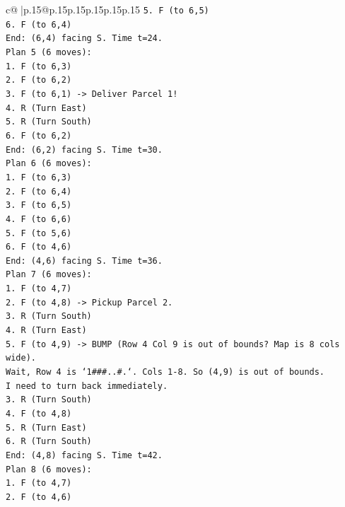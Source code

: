 \documentclass{article}
\begin{document}
{\begin{supertabular}{c@{$\;$}|p{.15\linewidth}@{}p{.15\linewidth}p{.15\linewidth}p{.15\linewidth}p{.15\linewidth}p{.15\linewidth}}
{{{\texttt{5. F (to 6,5)} \\
\texttt{6. F (to 6,4)} \\
\texttt{End: (6,4) facing S. Time t=24.} \\
\texttt{Plan 5 (6 moves):} \\
\texttt{1. F (to 6,3)} \\
\texttt{2. F (to 6,2)} \\
\texttt{3. F (to 6,1) {-}> Deliver Parcel 1!} \\
\texttt{4. R (Turn East)} \\
\texttt{5. R (Turn South)} \\
\texttt{6. F (to 6,2)} \\
\texttt{End: (6,2) facing S. Time t=30.} \\
\texttt{Plan 6 (6 moves):} \\
\texttt{1. F (to 6,3)} \\
\texttt{2. F (to 6,4)} \\
\texttt{3. F (to 6,5)} \\
\texttt{4. F (to 6,6)} \\
\texttt{5. F (to 5,6)} \\
\texttt{6. F (to 4,6)} \\
\texttt{End: (4,6) facing S. Time t=36.} \\
\texttt{Plan 7 (6 moves):} \\
\texttt{1. F (to 4,7)} \\
\texttt{2. F (to 4,8) {-}> Pickup Parcel 2.} \\
\texttt{3. R (Turn South)} \\
\texttt{4. R (Turn East)} \\
\texttt{5. F (to 4,9) {-}> BUMP (Row 4 Col 9 is out of bounds? Map is 8 cols wide).} \\
\texttt{Wait, Row 4 is `1\#\#\#..\#.`. Cols 1{-}8. So (4,9) is out of bounds.} \\
\texttt{I need to turn back immediately.} \\
\texttt{3. R (Turn South)} \\
\texttt{4. F (to 4,8)} \\
\texttt{5. R (Turn East)} \\
\texttt{6. R (Turn South)} \\
\texttt{End: (4,8) facing S. Time t=42.} \\
\texttt{Plan 8 (6 moves):} \\
\texttt{1. F (to 4,7)} \\
\texttt{2. F (to 4,6)} \\
}}}
\end{supertabular}}
\end{document}
